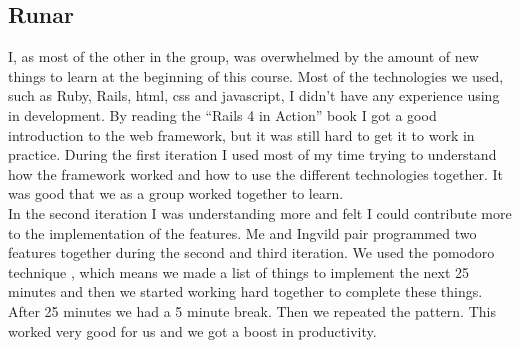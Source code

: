 \documentclass[a4paper]{article}
\begin{document}
\subsection{Runar}
I, as most of the other in the group, was overwhelmed by the amount of new things to learn at the beginning of this course. Most of the technologies we used, such as Ruby, Rails, html, css and javascript, I didn't have any experience using in development. By reading the ``Rails 4 in Action'' book \cite{railsaction} I got a good introduction to the web framework, but it was still hard to get it to work in practice. During the first iteration I used most of my time trying to understand how the framework worked and how to use the different technologies together. It was good that we as a group worked together to learn. \\

\noindent
In the second iteration I was understanding more and felt I could contribute more to the implementation of the features. Me and Ingvild pair programmed two features together during the second and third iteration. We used the pomodoro technique \cite{pomodoro}, which means we made a list of things to implement the next 25 minutes and then we started working hard together to complete these things. After 25 minutes we had a 5 minute break. Then we repeated the pattern. This worked very good for us and we got a boost in productivity.

\printbibliography[heading=bibintoc, title={References}]







\end{document}
